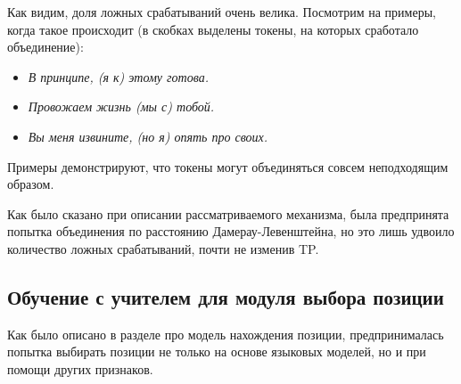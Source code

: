 Как видим, доля ложных срабатываний очень велика. Посмотрим на примеры, когда такое происходит (в скобках выделены токены, на которых сработало объединение): 
\begin{itemize}
	\item \textit{В принципе, (я к) этому готова.}
	\item \textit{Провожаем жизнь (мы с) тобой.}
	\item \textit{Вы меня извините, (но я) опять про своих.}
\end{itemize}

Примеры демонстрируют, что токены могут объединяться совсем неподходящим образом.

Как было сказано при описании рассматриваемого механизма, была предпринята попытка объединения по расстоянию Дамерау-Левенштейна, но это лишь удвоило количество ложных срабатываний, почти не изменив TP.

\subsection{Обучение с учителем для модуля выбора позиции}

Как было описано в разделе про модель нахождения позиции, предпринималась попытка выбирать позиции не только на основе языковых моделей, но и при помощи других признаков.

